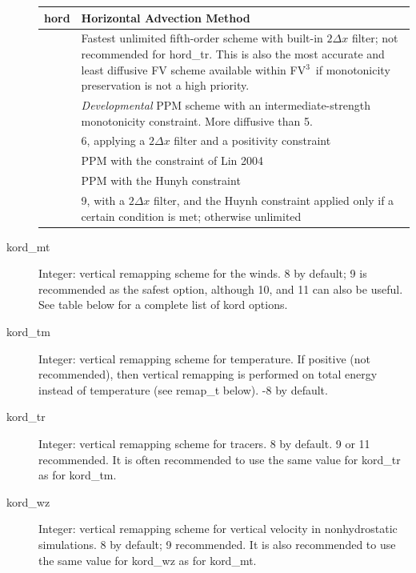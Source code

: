 \documentclass[12pt,letterpaper]{book}
\newcommand{\fv}{FV$^{\mathrm{3}}$}
\begin{document}
\begin{description}
\begin{table}[ht]
\begin{tabular}{|c|p{12cm}|}
\hline
{\centering hord} & 
{\raggedright Horizontal Advection Method}\\
\hline
{\centering 5} & 
{\raggedright Fastest unlimited fifth-order scheme with built-in $2\Delta x$ filter; not recommended for hord\_tr. This is also the most accurate and least diffusive FV scheme available within \fv\ if monotonicity preservation is not a high priority.
}\\
\hline
{\centering 6} & 
{\raggedright \textit{Developmental} PPM scheme with an intermediate-strength monotonicity constraint. More diffusive than 5. }\\
\hline
{\centering 7} & 
{\raggedright 6, applying a $2\Delta x$ filter and a positivity constraint}\\
\hline
{\centering 8} & 
{\raggedright PPM with the constraint of Lin 2004}\\
\hline
{\centering 9} & 
{\raggedright PPM with the Hunyh constraint}\\
\hline
{\centering 10} & 
{\raggedright 9, with a $2\Delta x$ filter, and the Huynh constraint applied only if a certain condition is met; otherwise unlimited}\\
\hline
\end{tabular}

\end{table}
 


\item[kord\_mt] Integer: vertical remapping scheme for the winds. 
8 by default; 9 is recommended as the safest option, although 10, and 11 can also be useful. See table below for a complete list of kord options.


\item[kord\_tm] Integer: vertical remapping scheme for temperature. If positive (not recommended), then vertical remapping is performed on total energy instead of temperature 
(see remap\_t below). -8 by default. 


\item[kord\_tr] Integer: vertical remapping scheme for tracers. 
8 by default. 9 or 11 recommended. It is often recommended to use the same value for kord\_tr as for kord\_tm.


\item[kord\_wz] Integer: vertical remapping scheme for vertical velocity in nonhydrostatic simulations. 
8 by default; 9 recommended. It is also recommended to use the same value for kord\_wz as for kord\_mt. 


\end{description}
\end{document}
